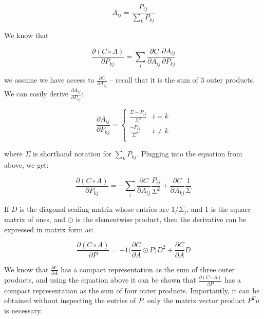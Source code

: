 \documentclass[12]{article}
\begin{document}
$$ A_{ij} = \frac{P_{ij}}{\sum_{k} P_{kj}} $$

We know that 

$$ \frac{\partial (C \circ A)}{\partial P_{kj}} = \sum_{i} \frac{\partial C}{\partial A_{ij}} \frac{\partial A_{ij}}{\partial P_{kj}} $$

we assume we have access to $ \frac{\partial C}{\partial A_{ij}} $ -- recall that it is the sum of 3 outer products.  We can easily derive $ \frac{\partial A_{ij}}{\partial P_{kj}} $:

$$ \frac{\partial A_{ij}}{\partial P_{kj}} = 
\begin{cases}
\frac{\Sigma - P_{ij}}{\Sigma^2} & i = k \\
\frac{- P_{ij}}{\Sigma^2} & i \neq k \\
\end{cases} $$

where $ \Sigma $ is shorthand notation for $ \sum_k P_{kj} $.  Plugging into the equation from above, we get:

$$ \frac{\partial (C \circ A)}{\partial P_{kj}} = -\sum_{i} \frac{\partial C}{\partial A_{ij}} \frac{P_{ij}}{\Sigma^2} + \frac{\partial C}{\partial A_{kj}} \frac{1}{\Sigma} $$

If $D$ is the diagonal scaling matrix whose entries are $ 1/\Sigma_j $, and $1$ is the square matrix of ones, and $ \odot $ is the elementwise product, then the derivative can be expressed in matrix form as:

$$ \frac{\partial (C \circ A)}{\partial P} = -1 \Big(\frac{\partial C}{\partial A} \odot P \Big) D^2 + \frac{\partial C}{\partial A} D $$

We know that $ \frac{\partial C}{\partial A} $ has a compact representation as the sum of three outer products, and using the equation above it can be shown that $ \frac{\partial (C \circ A)}{\partial P} $ has a compact representation as the sum of four outer products.  Importantly, it can be obtained without inspecting the entries of $P$, only the matrix vector product $P^T u$ is necessary. 
\end{document}
